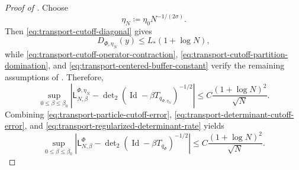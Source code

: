 \documentclass[11pt,reqno]{amsart}
\numberwithin{equation}{section}
\theoremstyle{plain}
\theoremstyle{definition}
\newcommand{\Id}{\operatorname{Id}}
\newcommand{\be}{\beta}
\begin{document}
\begin{proof}[Proof of ]
Choose
\begin{equation}
 \eta_N\coloneqq\eta_0N^{-1/(2\sigma)}.
 \label{eq:transport-optimized-cutoff}
\end{equation}
Then \eqref{eq:transport-cutoff-diagonal} gives
\begin{equation}
 D_{\Phi,\eta_N}(y)\leq L_*(1+\log N),
 \label{eq:transport-logarithmic-diagonal}
\end{equation}
while \eqref{eq:transport-cutoff-operator-contraction}, \eqref{eq:transport-cutoff-partition-domination}, and \eqref{eq:transport-centered-buffer-constant} verify the remaining assumptions of .  Therefore,
\begin{equation}
 \sup_{0\leq\be\leq\be_0}
 \left|\mathsf L_{N,\be}^{\Phi,\eta_N}
 -\det\nolimits_2(\Id-\be T_{q_{\Phi,\eta_N}})^{-1/2}\right|
 \leq C\frac{(1+\log N)^2}{\sqrt N}.
 \label{eq:transport-regularized-determinant-rate}
\end{equation}
Combining \eqref{eq:transport-particle-cutoff-error}, \eqref{eq:transport-determinant-cutoff-error}, and \eqref{eq:transport-regularized-determinant-rate} yields
\begin{equation}
 \sup_{0\leq\be\leq\be_0}
 \left|\mathsf L_{N,\be}^{\Phi}
 -\det\nolimits_2(\Id-\be T_{q_\Phi})^{-1/2}\right|
 \leq C\frac{(1+\log N)^2}{\sqrt N}.
 \label{eq:transport-centered-final-rate}
\end{equation}


\end{proof}
\end{document}
